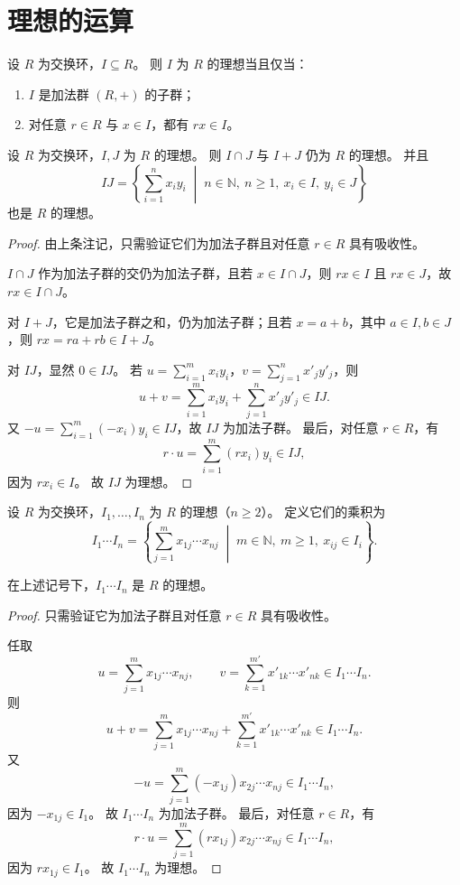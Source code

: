 \documentclass[lang=cn,a4paper,newtx]{elegantbook}
\begin{document}
\section{理想的运算}

\begin{remark}
  设 $R$ 为交换环，$I\subseteq R$。
  则 $I$ 为 $R$ 的理想当且仅当：
  \begin{enumerate}
    \item $I$ 是加法群 $(R,+)$ 的子群；
    \item 对任意 $r\in R$ 与 $x\in I$，都有 $rx\in I$。
  \end{enumerate}
\end{remark}

\begin{proposition}
  设 $R$ 为交换环，$I,J$ 为 $R$ 的理想。
  则 $I\cap J$ 与 $I+J$ 仍为 $R$ 的理想。
  并且
  \[
    IJ=\left\{\sum_{i=1}^n x_i y_i\;\middle|\; n\in\mathbb{N},\ n\ge 1,\ x_i\in I,\ y_i\in J\right\}
  \]
  也是 $R$ 的理想。
\end{proposition}

\begin{proof}
  由上条注记，只需验证它们为加法子群且对任意 $r\in R$ 具有吸收性。

  $I\cap J$ 作为加法子群的交仍为加法子群，且若 $x\in I\cap J$，则 $rx\in I$ 且 $rx\in J$，故 $rx\in I\cap J$。

  对 $I+J$，它是加法子群之和，仍为加法子群；且若 $x=a+b$，其中 $a\in I,b\in J$，则 $rx=ra+rb\in I+J$。

  对 $IJ$，显然 $0\in IJ$。
  若 $u=\sum_{i=1}^m x_i y_i$，$v=\sum_{j=1}^n x'_j y'_j$，则
  \[
    u+v=\sum_{i=1}^m x_i y_i+\sum_{j=1}^n x'_j y'_j\in IJ.
  \]
  又 $-u=\sum_{i=1}^m (-x_i)y_i\in IJ$，故 $IJ$ 为加法子群。
  最后，对任意 $r\in R$，有
  \[
    r\cdot u=\sum_{i=1}^m (rx_i)y_i\in IJ,
  \]
  因为 $rx_i\in I$。
  故 $IJ$ 为理想。
\end{proof}

\begin{definition}
  设 $R$ 为交换环，$I_1,\dots,I_n$ 为 $R$ 的理想（$n\ge 2$）。
  定义它们的乘积为
  \[
    I_1\cdots I_n=\left\{\sum_{j=1}^m x_{1j}\cdots x_{nj}\;\middle|\; m\in\mathbb{N},\ m\ge 1,\ x_{ij}\in I_i\right\}.
  \]
\end{definition}

\begin{proposition}
  在上述记号下，$I_1\cdots I_n$ 是 $R$ 的理想。
\end{proposition}

\begin{proof}
  只需验证它为加法子群且对任意 $r\in R$ 具有吸收性。

  任取
  \[
    u=\sum_{j=1}^m x_{1j}\cdots x_{nj},\qquad v=\sum_{k=1}^{m'} x'_{1k}\cdots x'_{nk}\in I_1\cdots I_n.
  \]
  则
  \[
    u+v=\sum_{j=1}^m x_{1j}\cdots x_{nj}+\sum_{k=1}^{m'} x'_{1k}\cdots x'_{nk}\in I_1\cdots I_n.
  \]
  又
  \[
    -u=\sum_{j=1}^m (-x_{1j})x_{2j}\cdots x_{nj}\in I_1\cdots I_n,
  \]
  因为 $-x_{1j}\in I_1$。
  故 $I_1\cdots I_n$ 为加法子群。
  最后，对任意 $r\in R$，有
  \[
    r\cdot u=\sum_{j=1}^m (rx_{1j})x_{2j}\cdots x_{nj}\in I_1\cdots I_n,
  \]
  因为 $rx_{1j}\in I_1$。
  故 $I_1\cdots I_n$ 为理想。
\end{proof}
\end{document}
